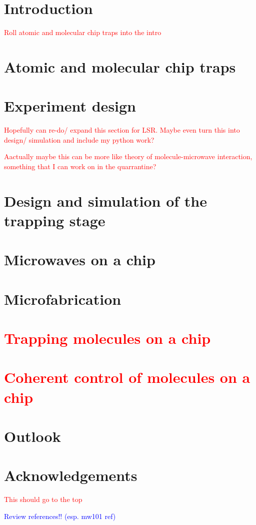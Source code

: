 \documentclass[a4paper, 12pt, twoside]{report}
\newcommand{\cm}[1]{\textcolor{blue}{#1}} %
\newcommand{\thesis}[1]{\textcolor{red}{#1}} %
\begin{document}
\chapter{Introduction}
\label{intro}
\thesis{Roll atomic and molecular chip traps into the intro}



\chapter{Atomic and molecular chip traps}
\label{chiptraps}


\chapter{Experiment design}
\label{experiment}

\thesis{Hopefully can re-do/ expand this section for LSR. Maybe even turn this
into design/ simulation and include my python work?}

\thesis{Aactually maybe this can be more like theory of molecule-microwave
interaction, something that I can work on in the quarrantine?}



\chapter{Design and simulation of the trapping stage}
\label{design}


\chapter{Microwaves on a chip}


\chapter{Microfabrication}
\label{fab}


\thesis{
\chapter{Trapping molecules on a chip}
\chapter{Coherent control of molecules on a chip}
}

\chapter{Outlook}
\label{outlook}


\clearpage

\chapter*{Acknowledgements}
\thesis{This should go to the top}


\cm{Review references!! (esp. mw101 ref)}


\end{document}
